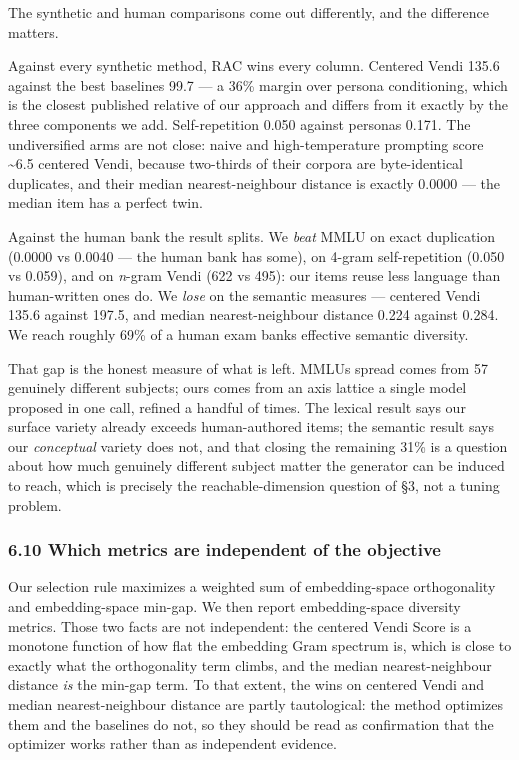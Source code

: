 \documentclass[
  11pt,
]{article}
\theoremstyle{plain}
\theoremstyle{definition}
\begin{document}
The synthetic and human comparisons come out differently, and the
difference matters.

Against every synthetic method, RAC wins every column. Centered Vendi
135.6 against the best baseline\textquotesingle s 99.7 --- a 36\% margin
over persona conditioning, which is the closest published relative of
our approach and differs from it exactly by the three components we add.
Self-repetition 0.050 against persona\textquotesingle s 0.171. The
undiversified arms are not close: naive and high-temperature prompting
score \textasciitilde6.5 centered Vendi, because two-thirds of their
corpora are byte-identical duplicates, and their median
nearest-neighbour distance is exactly 0.0000 --- the median item has a
perfect twin.

Against the human bank the result splits. We \emph{beat} MMLU on exact
duplication (0.0000 vs 0.0040 --- the human bank has some), on 4-gram
self-repetition (0.050 vs 0.059), and on \emph{n}-gram Vendi (622 vs
495): our items reuse less language than human-written ones do. We
\emph{lose} on the semantic measures --- centered Vendi 135.6 against
197.5, and median nearest-neighbour distance 0.224 against 0.284. We
reach roughly 69\% of a human exam bank\textquotesingle s effective
semantic diversity.

That gap is the honest measure of what is left. MMLU\textquotesingle s
spread comes from 57 genuinely different subjects; ours comes from an
axis lattice a single model proposed in one call, refined a handful of
times. The lexical result says our surface variety already exceeds
human-authored items; the semantic result says our \emph{conceptual}
variety does not, and that closing the remaining 31\% is a question
about how much genuinely different subject matter the generator can be
induced to reach, which is precisely the reachable-dimension question of
§3, not a tuning problem.

\subsubsection{6.10 Which metrics are independent of the
objective}\label{610-which-metrics-are-independent-of-the-objective}

Our selection rule maximizes a weighted sum of embedding-space
orthogonality and embedding-space min-gap. We then report
embedding-space diversity metrics. Those two facts are not independent:
the centered Vendi Score is a monotone function of how flat the
embedding Gram spectrum is, which is close to exactly what the
orthogonality term climbs, and the median nearest-neighbour distance
\emph{is} the min-gap term. To that extent, the wins on centered Vendi
and median nearest-neighbour distance are partly tautological: the
method optimizes them and the baselines do not, so they should be read
as confirmation that the optimizer works rather than as independent
evidence.
\end{document}
